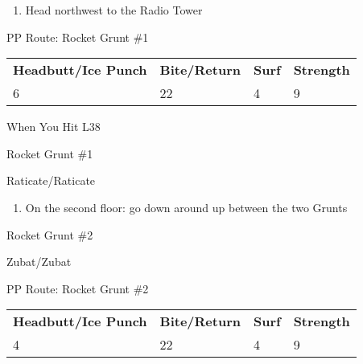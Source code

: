 \begin{paracol}{2}
\begin{enumerate}[resume]
    \item Head northwest to the Radio Tower
\end{enumerate}

\switchcolumn*
\alignBoxes
\begin{misc}{PP Route: Rocket Grunt \#1}
	\varwb
	\begin{tabu} to \textwidth {X[6,c] X[5,c] X[4,c] X[4,c]}
		\textbf{Headbutt/Ice Punch} & \textbf{Bite/Return} & \textbf{Surf} & \textbf{Strength}\\ 
		6 & 22 & 4 & 9
	\end{tabu}
	\varwe
\end{misc}

\begin{misc}{When You Hit L38}
	\varwb
	\begin{notes}
		\item {}
	\end{notes}
	\varwe
\end{misc}

\switchcolumn
\begin{trainer}{Rocket Grunt \#1}
	\varwb
	\begin{fightSection}{Raticate/Raticate}
		\item {} \headbutt{} 
	\end{fightSection}
	\varwe
\end{trainer}

\begin{enumerate}[resume]
    \item On the second floor: go down \pointRight{} around \pointRight{} up between the two Grunts
\end{enumerate}

\switchcolumnTwice[*]
\begin{trainer}{Rocket Grunt \#2}
	\varwb
	\begin{fightSection}{Zubat/Zubat}
		\item {} \headbutt{} 
	\end{fightSection}
	\varwe
\end{trainer}

\switchcolumn
\begin{misc}{PP Route: Rocket Grunt \#2}
	\varwb
	\begin{tabu} to \textwidth {X[6,c] X[5,c] X[4,c] X[4,c]}
		\textbf{Headbutt/Ice Punch} & \textbf{Bite/Return} & \textbf{Surf} & \textbf{Strength}\\ 
		4 & 22 & 4 & 9
	\end{tabu}
	\varwe
\end{misc}


\end{paracol}
